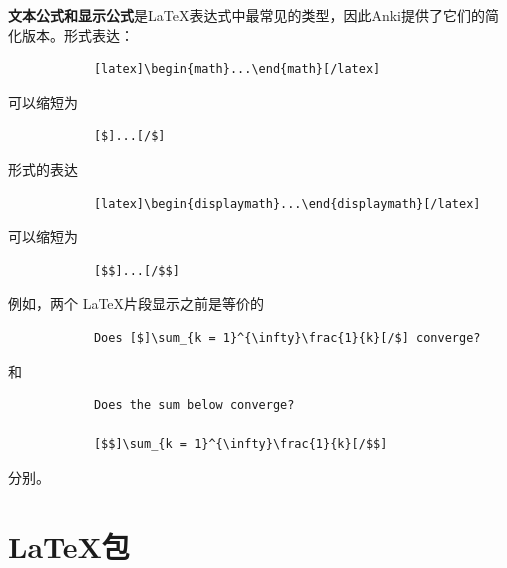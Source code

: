 \documentclass[a4paper]{book}
\begin{document}
		\textbf{文本公式和显示公式}是LaTeX表达式中最常见的类型，因此Anki提供了它们的简化版本。形式表达：
		
		\begin{shaded}\begin{verbatim}
			[latex]\begin{math}...\end{math}[/latex]
			\end{verbatim}\end{shaded}
		
		可以缩短为
		
		\begin{shaded}\begin{verbatim}
			[$]...[/$]
			\end{verbatim}\end{shaded}
		
		形式的表达
		
		\begin{shaded}\begin{verbatim}
			[latex]\begin{displaymath}...\end{displaymath}[/latex]
			\end{verbatim}\end{shaded}
		
		可以缩短为
		
		\begin{shaded}\begin{verbatim}
			[$$]...[/$$]
			\end{verbatim}\end{shaded}
		
		例如，两个 LaTeX片段显示之前是等价的
		
		\begin{shaded}\begin{verbatim}
			Does [$]\sum_{k = 1}^{\infty}\frac{1}{k}[/$] converge?
			\end{verbatim}\end{shaded}
		
		和
		
		\begin{shaded}\begin{verbatim}
			Does the sum below converge?
			
			[$$]\sum_{k = 1}^{\infty}\frac{1}{k}[/$$]
			\end{verbatim}\end{shaded}
		
		分别。
		
		\section{LaTeX包}
		
\end{document}
